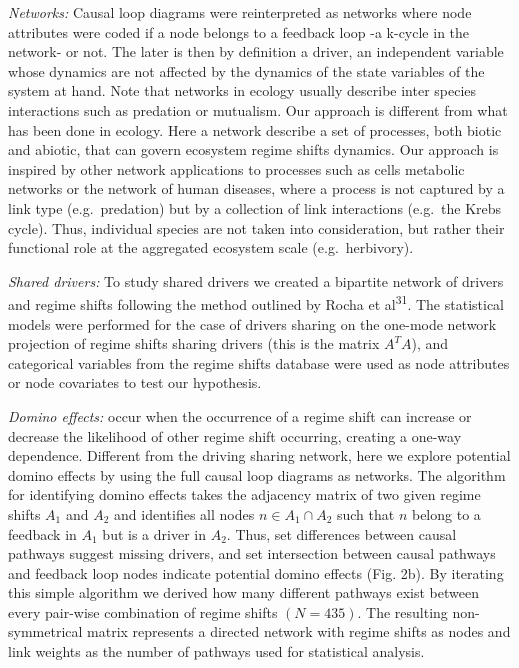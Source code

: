 \documentclass[9pt,]{article}
\begin{document}
\emph{Networks:} Causal loop diagrams were reinterpreted as networks
where node attributes were coded if a node belongs to a feedback loop -a
k-cycle in the network- or not. The later is then by definition a
driver, an independent variable whose dynamics are not affected by the
dynamics of the state variables of the system at hand. Note that
networks in ecology usually describe inter species interactions such as
predation or mutualism. Our approach is different from what has been
done in ecology. Here a network describe a set of processes, both biotic
and abiotic, that can govern ecosystem regime shifts dynamics. Our
approach is inspired by other network applications to processes such as
cells metabolic networks or the network of human diseases, where a
process is not captured by a link type (e.g.~predation) but by a
collection of link interactions (e.g.~the Krebs cycle). Thus, individual
species are not taken into consideration, but rather their functional
role at the aggregated ecosystem scale (e.g.~herbivory).

\emph{Shared drivers:} To study shared drivers we created a bipartite
network of drivers and regime shifts following the method outlined by
Rocha et al\textsuperscript{31}. The statistical models were performed
for the case of drivers sharing on the one-mode network projection of
regime shifts sharing drivers (this is the matrix \(A^TA\)), and
categorical variables from the regime shifts database were used as node
attributes or node covariates to test our hypothesis.

\emph{Domino effects:} occur when the occurrence of a regime shift can
increase or decrease the likelihood of other regime shift occurring,
creating a one-way dependence. Different from the driving sharing
network, here we explore potential domino effects by using the full
causal loop diagrams as networks. The algorithm for identifying domino
effects takes the adjacency matrix of two given regime shifts \(A_1\)
and \(A_2\) and identifies all nodes \(n \in A_1 \cap A_2\) such that
\(n\) belong to a feedback in \(A_1\) but is a driver in \(A_2\). Thus,
set differences between causal pathways suggest missing drivers, and set
intersection between causal pathways and feedback loop nodes indicate
potential domino effects (Fig. 2b). By iterating this simple algorithm
we derived how many different pathways exist between every pair-wise
combination of regime shifts \((N=435)\). The resulting non-symmetrical
matrix represents a directed network with regime shifts as nodes and
link weights as the number of pathways used for statistical analysis.
\end{document}
